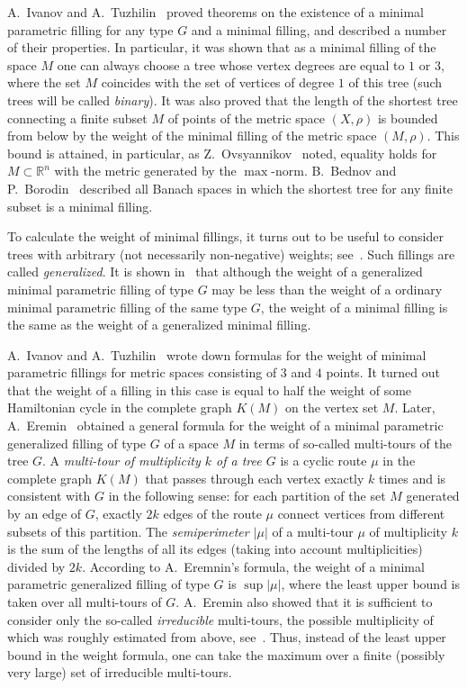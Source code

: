 \documentclass[10pt]{article}
\theoremstyle{plain}
\theoremstyle{definition}
\newcommand{\R}{{\mathbb R}}
\begin{document}
A.~Ivanov and A.~Tuzhilin~\cite{IT_MSb} proved theorems on the existence of a minimal parametric filling for any type $G$ and a minimal filling, and described a number of their properties. In particular, it was shown that as a minimal filling of the space $M$ one can always choose a tree whose vertex degrees are equal to $1$ or $3$, where the set $M$ coincides with the set of vertices of degree $1$ of this tree (such trees will be called \emph{binary}). It was also proved that the length of the shortest tree connecting a finite subset $M$ of points of the metric space $(X,\rho)$ is bounded from below by the weight of the minimal filling of the metric space $(M,\rho)$. This bound is attained, in particular, as Z.~Ovsyannikov~\cite{Ovs} noted, equality holds for $M\subset\R^n$ with the metric generated by the $\max$-norm. B.~Bednov and P.~Borodin~\cite{BB} described all Banach spaces in which the shortest tree for any finite subset is a minimal filling.

To calculate the weight of minimal fillings, it turns out to be useful to consider trees with arbitrary (not necessarily non-negative) weights; see~\cite{IOST}. Such fillings are called \emph{generalized}. It is shown in~\cite{IOST} that although the weight of a generalized minimal parametric filling of type $G$ may be less than the weight of a ordinary minimal parametric filling of the same type $G$, the weight of a minimal filling is the same as the weight of a generalized minimal filling.

A.~Ivanov and A.~Tuzhilin~\cite{IT_MSb} wrote down formulas for the weight of minimal parametric fillings for metric spaces consisting of $3$ and $4$ points. It turned out that the weight of a filling in this case is equal to half the weight of some Hamiltonian cycle in the complete graph $K(M)$ on the vertex set $M$. Later, A.~Eremin~\cite{Eremin} obtained a general formula for the weight of a minimal parametric generalized filling of type $G$ of a space $M$ in terms of so-called multi-tours of the tree $G$. A \emph{multi-tour of multiplicity $k$ of a tree $G$} is a cyclic route $\mu$ in the complete graph $K(M)$ that passes through each vertex exactly $k$ times and is consistent with $G$ in the following sense: for each partition of the set $M$ generated by an edge of $G$, exactly $2k$ edges of the route $\mu$ connect vertices from different subsets of this partition. The  \emph{semiperimeter $|\mu|$} of a multi-tour $\mu$ of multiplicity $k$ is the sum of the lengths of all its edges (taking into account multiplicities) divided by $2k$. According to A.~Eremnin's formula, the weight of a minimal parametric generalized filling of type $G$ is $\sup|\mu|$, where the least upper bound is taken over all multi-tours of $G$. A.~Eremin also showed that it is sufficient to consider only the so-called \emph{irreducible\/} multi-tours, the possible multiplicity of which was roughly estimated from above, see~\cite{Eremin}. Thus, instead of the least upper bound in the weight formula, one can take the maximum over a finite (possibly very large) set of irreducible multi-tours.
\end{document}
